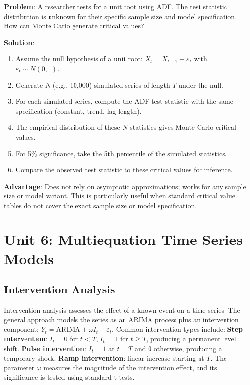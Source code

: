 \documentclass[11pt,a4paper]{article}
\begin{document}
\begin{tcolorbox}[colback=blue!5!white,colframe=blue!75!black,title=\textbf{Worked Example 13: Monte Carlo for ADF Critical Values}]
\textbf{Problem}: A researcher tests for a unit root using ADF. The test statistic distribution is unknown for their specific sample size and model specification. How can Monte Carlo generate critical values?

\textbf{Solution}:
\begin{enumerate}
    \item Assume the null hypothesis of a unit root: $X_t = X_{t-1} + \varepsilon_t$ with $\varepsilon_t \sim N(0,1)$.
    \item Generate $N$ (e.g., 10,000) simulated series of length $T$ under the null.
    \item For each simulated series, compute the ADF test statistic with the same specification (constant, trend, lag length).
    \item The empirical distribution of these $N$ statistics gives Monte Carlo critical values.
    \item For 5\% significance, take the 5th percentile of the simulated statistics.
    \item Compare the observed test statistic to these critical values for inference.
\end{enumerate}
\textbf{Advantage}: Does not rely on asymptotic approximations; works for any sample size or model variant. This is particularly useful when standard critical value tables do not cover the exact sample size or model specification.
\end{tcolorbox}


\section{Unit 6: Multiequation Time Series Models}

\subsection{Intervention Analysis}

Intervention analysis assesses the effect of a known event on a time series. The general approach models the series as an ARIMA process plus an intervention component: $Y_t = \text{ARIMA} + \omega I_t + \varepsilon_t$. Common intervention types include: \textbf{Step intervention}: $I_t = 0$ for $t < T$, $I_t = 1$ for $t \geq T$, producing a permanent level shift. \textbf{Pulse intervention}: $I_t = 1$ at $t = T$ and 0 otherwise, producing a temporary shock. \textbf{Ramp intervention}: linear increase starting at $T$. The parameter $\omega$ measures the magnitude of the intervention effect, and its significance is tested using standard t-tests.
\end{document}
